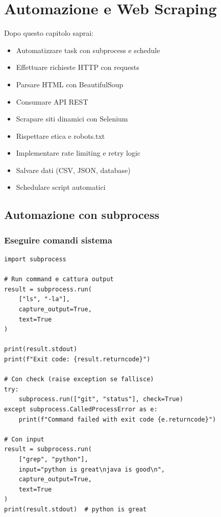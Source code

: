 \chapter{Automazione e Web Scraping}

\begin{tcolorbox}[title=Obiettivi del capitolo]
Dopo questo capitolo saprai:
\begin{itemize}
  \item Automatizzare task con subprocess e schedule
  \item Effettuare richieste HTTP con requests
  \item Parsare HTML con BeautifulSoup
  \item Consumare API REST
  \item Scrapare siti dinamici con Selenium
  \item Rispettare etica e robots.txt
  \item Implementare rate limiting e retry logic
  \item Salvare dati (CSV, JSON, database)
  \item Schedulare script automatici
\end{itemize}
\end{tcolorbox}

\section{Automazione con subprocess}

\subsection{Eseguire comandi sistema}

\begin{lstlisting}
import subprocess

# Run command e cattura output
result = subprocess.run(
    ["ls", "-la"],
    capture_output=True,
    text=True
)

print(result.stdout)
print(f"Exit code: {result.returncode}")

# Con check (raise exception se fallisce)
try:
    subprocess.run(["git", "status"], check=True)
except subprocess.CalledProcessError as e:
    print(f"Command failed with exit code {e.returncode}")

# Con input
result = subprocess.run(
    ["grep", "python"],
    input="python is great\njava is good\n",
    capture_output=True,
    text=True
)
print(result.stdout)  # python is great
\end{lstlisting}

